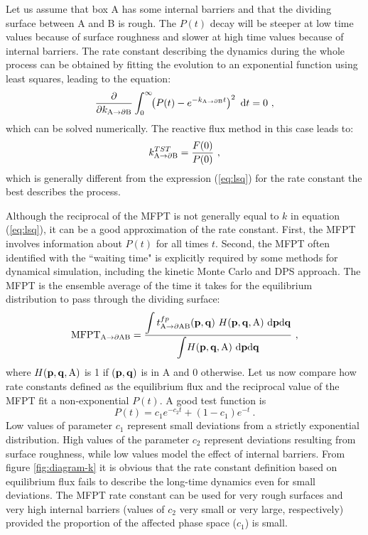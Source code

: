 Let us assume that box A has some internal barriers and that the dividing surface between A and B is rough.
The $P(t)$ decay will be steeper at low time values because of surface roughness and slower at high time values because of internal barriers.
The rate constant describing the dynamics during the whole process can be obtained by fitting the evolution to an exponential function using least squares, leading to the equation:
\begin{equation}
\label{eq:lsq}
\frac{\partial}{\partial k_{\rm A \rightarrow \partial B }} \int_0^{\infty} \!\! \left( P(t) - e^{- k_{\rm A \rightarrow \partial B } t } \right)^2 ~ {\rm d}t = 0 ~,
\end{equation}
which can be solved numerically.
The reactive flux method in this case leads to:
\begin{equation}
\label{eq:eq-flux-nonexp}
k^{TST}_{\rm A \rightarrow \partial B } = \frac{F(0)}{P(0)} ~,
\end{equation}
which is generally different from the expression (\ref{eq:lsq}) for the rate constant the best describes the process.

Although the reciprocal of the MFPT is not generally equal to $k$ in equation (\ref{eq:lsq}), it can be a good approximation of the rate constant.
First, the MFPT involves information about $P(t)$ for all times $t$.
Second, the MFPT often identified with the ``waiting time" is explicitly required by some methods for dynamical simulation, including the kinetic Monte Carlo\cite{Bortz1975, Gillespie1976, Fichthorn1991} and DPS approach.
The MFPT is the ensemble average of the time it takes for the equilibrium distribution to pass through the dividing surface:
\begin{equation}
\label{eq:mfpt-def}
{\rm MFPT_{A \rightarrow \partial AB}} = \frac{\displaystyle{\int t^{fp}_{\rm A \rightarrow \partial AB}({\bf p} ,{\bf q}) ~ H({\bf p},{\bf q}, {\rm A}) ~ {\rm d} {\bf p} {\rm d} {\bf q}}}
{\displaystyle{\int \! H({\bf p},{\bf q}, {\rm A}) ~ {\rm d} {\bf p} {\rm d} {\bf q}}} ~,
\end{equation}
where $H({\bf p},{\bf q},{\rm A})$ is 1 if $({\bf p},{\bf q})$ is in A and 0 otherwise.
Let us now compare how rate constants defined as the equilibrium flux and the reciprocal value of the MFPT fit a non-exponential $P(t)$.
A good test function is
\begin{equation}
\label{eq:test-ftn}
P(t) = c_1 e^{-c_2 t} + (1-c_1) e^{- t} ~.
\end{equation}
Low values of parameter $c_1$ represent small deviations from a strictly exponential distribution.
High values of the parameter $c_2$ represent deviations resulting from surface roughness, while low values model the effect of internal barriers.
From figure \ref{fig:diagram-k} it is obvious that the rate constant definition based on equilibrium flux fails to describe the long-time dynamics even for small deviations.
The MFPT rate constant can be used for very rough surfaces and very high internal barriers (values of $c_2$ very small or very large, respectively) provided the proportion of the affected phase space ($c_1$) is small.

